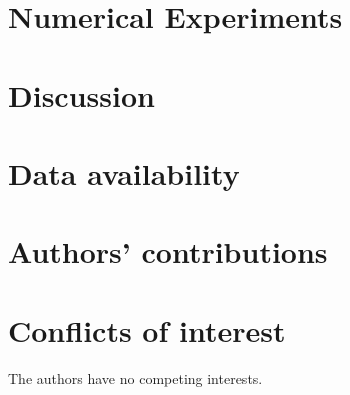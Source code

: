 \documentclass[a4paper,fleqn]{cas-sc}
\begin{document}
    \section{Numerical Experiments}
         \label{sec:numerical_experiments}
         
         
    \section{Discussion}
         \label{sec:discussion}
         
    \section*{Data availability}
         
    \section*{Authors’ contributions}
     
    \section*{Conflicts of interest}
     The authors have no competing interests.


\end{document}
